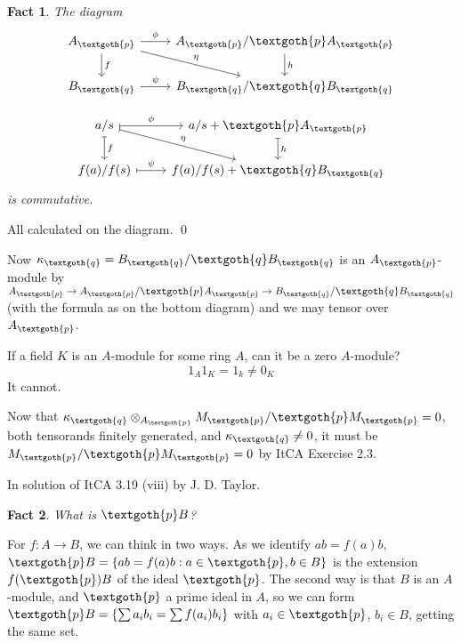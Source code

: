 \documentclass{article}
\newtheorem{theorem}{Fact}[section]
\begin{document}
\begin{theorem}
The diagram
\[
     \begin{tikzcd}
     A_\textgoth{p} \arrow{r}{\phi} \arrow{d}{f} \arrow{dr}{\eta} & A_\textgoth{p}/\textgoth{p}A_\textgoth{p} \arrow{d}{h} \\
     B_\textgoth{q} \arrow{r}{\psi} & B_\textgoth{q}/\textgoth{q}B_\textgoth{q}
     \end{tikzcd}
\]

\[
     \begin{tikzcd}
     a/s \arrow[r, mapsto, "\phi"] \arrow[d, mapsto, "f"] \arrow[dr, mapsto, "\eta"] & a/s + \textgoth{p}A_\textgoth{p} \arrow[d, mapsto, "h"] \\
     f(a)/f(s) \arrow[r, mapsto, "\psi"] & f(a)/f(s) + \textgoth{q}B_\textgoth{q}
     \end{tikzcd}
\]
is commutative.
\end{theorem}

All calculated on the diagram. \qed

Now $\kappa_\textgoth{q} = B_\textgoth{q}/\textgoth{q}B_\textgoth{q}$ is an $A_\textgoth{p}$-module by $A_\textgoth{p} \rightarrow A_\textgoth{p}/\textgoth{p}A_\textgoth{p} \rightarrow B_\textgoth{q}/\textgoth{q}B_\textgoth{q}$ (with the formula as on the bottom diagram) and we may tensor over $A_\textgoth{p}$. 

If a field $K$ is an $A$-module for some ring $A$, can it be a zero $A$-module?
\[
 1_A 1_K = 1_k \ne 0_K
\]
It cannot.

Now that $\kappa_\textgoth{q} \otimes_{A_\textgoth{p}} M_\textgoth{p}/\textgoth{p}M_\textgoth{p} = 0$, both tensorands finitely generated, and $\kappa_\textgoth{q} \ne 0$, it must be $M_\textgoth{p}/\textgoth{p}M_\textgoth{p} = 0$ by ItCA Exercise 2.3. 

In solution of ItCA 3.19 (viii) by J. D. Taylor.

\begin{theorem}
What is $\textgoth{p} B$?
\end{theorem}

For $f: A \rightarrow B$, we can think in two ways. As we identify $ab = f(a)b$,  $\textgoth{p} B = \{ ab = f(a)b : a \in \textgoth{p}, b \in B \}$ is the extension $f(\textgoth{p}) B$ of the ideal $\textgoth{p}$. The second way is that $B$ is an $A$-module, and $\textgoth{p}$ a prime ideal in $A$, so we can form $ \textgoth{p} B = \{ \sum a_i b_i = \sum f(a_i)b_i \} $ with $a_i \in \textgoth{p}$, $b_i \in B$, getting the same set.
\end{document}
